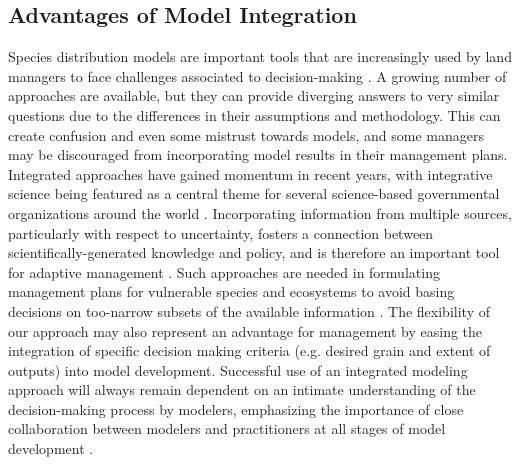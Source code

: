 \documentclass[11pt]{article}
\begin{document}

\subsection*{Advantages of Model Integration}
Species distribution models are important tools that are increasingly used by land managers to face challenges associated to decision-making \citep{Guisan2013}.
A growing number of approaches are available, but they can provide diverging answers to very similar questions due to the differences in their assumptions and methodology. 
This can create confusion and even some mistrust towards models, and some managers may be discouraged from incorporating model results in their management plans. 
Integrated approaches have gained momentum in recent years, with integrative science being featured as a central theme for several science-based governmental organizations around the world \citep[e.g.,][]{Bernier2013}. 
Incorporating information from multiple sources, particularly with respect to uncertainty,  fosters a connection between scientifically-generated knowledge and policy, and is therefore an important tool for adaptive management \citep[][Fig. \ref{fig:management}]{Rehme2011}.
Such approaches are needed in formulating management plans for vulnerable species and ecosystems to avoid basing decisions on too-narrow subsets of the available information \citep{Dawson2011}.
The flexibility of our approach may also represent an advantage for management by easing the integration of specific decision making criteria (e.g. desired grain and extent of outputs) into model development. 
Successful use of an integrated modeling approach will always remain dependent on an intimate understanding of the decision-making process by modelers, emphasizing the importance of close collaboration between modelers and practitioners at all stages of model development \citep{Guisan2013}.
\end{document}
